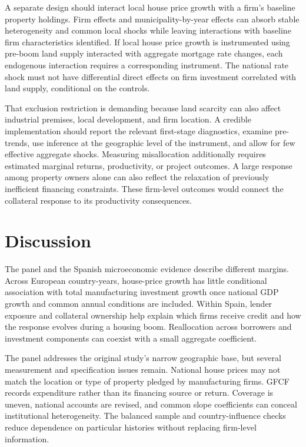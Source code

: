 \documentclass[11pt,letterpaper]{article}
\begin{document}
A separate design should interact local house price growth with a firm's baseline property holdings. Firm effects and municipality-by-year effects can absorb stable heterogeneity and common local shocks while leaving interactions with baseline firm characteristics identified. If local house price growth is instrumented using pre-boom land supply interacted with aggregate mortgage rate changes, each endogenous interaction requires a corresponding instrument. The national rate shock must not have differential direct effects on firm investment correlated with land supply, conditional on the controls.


That exclusion restriction is demanding because land scarcity can also affect industrial premises, local development, and firm location. A credible implementation should report the relevant first-stage diagnostics, examine pre-trends, use inference at the geographic level of the instrument, and allow for few effective aggregate shocks. Measuring misallocation additionally requires estimated marginal returns, productivity, or project outcomes. A large response among property owners alone can also reflect the relaxation of previously inefficient financing constraints. These firm-level outcomes would connect the collateral response to its productivity consequences.



\section{Discussion}
The panel and the Spanish microeconomic evidence describe different margins. Across European country-years, house-price growth has little conditional association with total manufacturing investment growth once national GDP growth and common annual conditions are included. Within Spain, lender exposure and collateral ownership help explain which firms receive credit and how the response evolves during a housing boom. Reallocation across borrowers and investment components can coexist with a small aggregate coefficient.

The panel addresses the original study's narrow geographic base, but several measurement and specification issues remain. National house prices may not match the location or type of property pledged by manufacturing firms. GFCF records expenditure rather than its financing source or return. Coverage is uneven, national accounts are revised, and common slope coefficients can conceal institutional heterogeneity. The balanced sample and country-influence checks reduce dependence on particular histories without replacing firm-level information.
\end{document}
